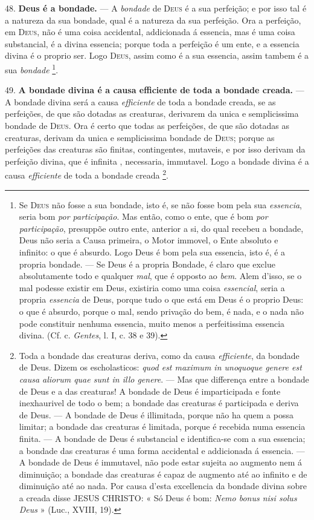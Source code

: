 48. \textbf{Deus é a bondade.} --- A \emph{bondade} de \textsc{Deus} é a sua perfeição; e por isso tal é a natureza da sua bondade, qual é a natureza da sua perfeição. Ora a perfeição, em \textsc{Deus}, não é uma coisa accidental, addicionada á essencia, mas é uma coisa substancial, é a divina essencia; porque toda a perfeição é um ente, e a essencia divina é o proprio ser. Logo \textsc{Deus}, assim como é a sua essencia, assim tambem é a sua \emph{bondade} \footnote{Se \textsc{Deus} não fosse a sua bondade, isto é, se não fosse bom pela sua \emph{essencia}, seria bom \emph{por participação}. Mas então, como o ente, que é bom \emph{por participação}, presuppõe outro ente, anterior a si, do qual recebeu a bondade, Deus não seria a Causa primeira, o Motor immovel, o Ente absoluto e infinito: o que é absurdo. Logo Deus é bom pela sua essencia, isto é, é a propria bondade. --- Se Deus é a propria Bondade, é claro que exclue absolutamente todo e qualquer \emph{mal}, que é opposto ao \emph{bem}. Alem d'isso, se o mal podesse existir em Deus, existiria como uma coisa \emph{essencial}, seria a propria \emph{essencia} de Deus, porque tudo o que está em Deus é o proprio Deus: o que é absurdo, porque o mal, sendo privação do bem, é nada, e o nada não pode constituir nenhuma essencia, muito menos a perfeitissima essencia divina. (Cf. c. \emph{Gentes}, l. I, c. 38 e 39).}.

49. \textbf{A bondade divina é a causa efficiente de toda a bondade creada.} --- A bondade divina será a causa \emph{efficiente} de toda a bondade creada, se as perfeições, de que são dotadas as creaturas, derivarem da unica e semplicissima bondade de \textsc{Deus}. Ora é certo que todas as perfeições, de que são dotadas as creaturas, derivam da unica e semplicissima bondade de \textsc{Deus}; porque as perfeições das creaturas são finitas, contingentes, mutaveis, e por isso derivam da perfeição divina, que é infinita  , necessaria, immutavel. Logo a bondade divina é a causa \emph{efficiente} de toda a bondade creada \footnote{Toda a bondade das creaturas deriva, como da causa \emph{efficiente}, da bondade de Deus. Dizem os escholasticos: \emph{quod est maximum in unoquoque genere est causa aliorum quae sunt in illo genere}. --- Mas que differença entre a bondade de Deus e a das creaturas! A bondade de Deus é imparticipada e fonte inexhaurivel de todo o bem; a bondade das creaturas é participada e deriva de Deus. --- A bondade de Deus é illimitada, porque não ha quem a possa limitar; a bondade das creaturas é limitada, porque é recebida numa essencia finita. --- A bondade de Deus é substancial e identifica-se com a sua essencia; a bondade das creaturas é uma forma accidental e addicionada á essencia. --- A bondade de Deus é immutavel, não pode estar sujeita ao augmento nem á diminuição; a bondade das creaturas é capaz de augmento até ao infinito e de diminuição até ao nada. Por causa d'esta excellencia da bondade divina sobre a creada disse \textsc{JESUS CHRISTO}: « Só Deus é bom: \emph{Nemo bonus nisi solus Deus} » (Luc., XVIII, 19).}.

